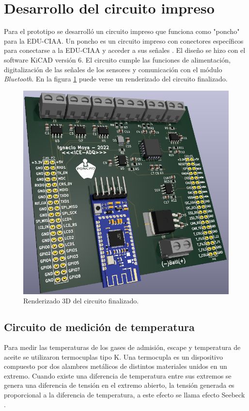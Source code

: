 \section{Desarrollo del circuito impreso} \label{circuito}

Para el prototipo se desarrolló un circuito impreso que funciona como "poncho"  para la EDU-CIAA. Un poncho es un circuito impreso con conectores específicos para conectarse a la EDU-CIAA y acceder a sus señales \cite{poncho}. El diseño se hizo con el software KiCAD versión 6. El circuito cumple las funciones de alimentación, digitalización de las señales de los sensores y comunicación con el módulo \textit{Bluetooth}. En la figura \ref{fig:circuito-3d} puede verse un renderizado del circuito finalizado. 

\begin{figure}[htpb]
\centering
\includegraphics[width=.8\textwidth]{./Figures/circuito-3d.png}
\caption{Renderizado 3D del circuito finalizado.}
\label{fig:circuito-3d}
\end{figure}

\subsection{Circuito de medición de temperatura}

Para medir las temperaturas de los gases de admisión, escape y temperatura de aceite se utilizaron termocuplas tipo K. Una termocupla es un dispositivo compuesto por dos alambres metálicos de distintos materiales unidos en un extremo. Cuando existe una diferencia de temperatura entre sus extremos se genera una diferencia de tensión en el extremo abierto, la tensión generada es proporcional a la diferencia de temperatura, a este efecto se llama efecto Seebeck \cite{termocupla}.

